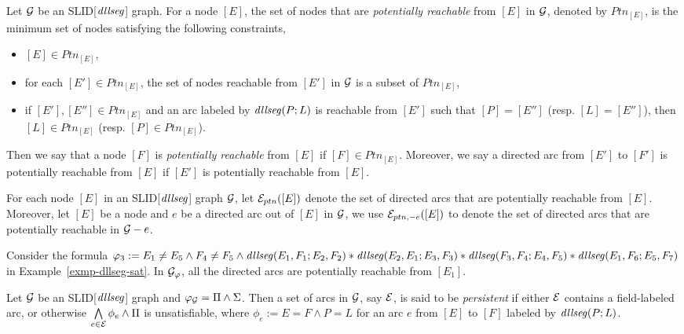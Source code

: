 \documentclass{llncs}
\begin{document}
\begin{definition}
Let $\mathcal{G}$ be an SLID[$\mathit{dllseg}$] graph. For a node $[E]$, the set of nodes that are \emph{potentially reachable} from $[E]$ in $\mathcal{G}$, denoted by $Ptn_{[E]}$, is the minimum set of nodes satisfying the following constraints,
\begin{itemize}
\item  $[E] \in Ptn_{[E]}$,

\item for each $[E'] \in Ptn_{[E]}$, the set of nodes reachable from $[E']$ in $\mathcal{G}$ is a subset of $Ptn_{[E]}$,
%
\item if $[E'], [E''] \in Ptn_{[E]}$ and an arc labeled by $\mathit{dllseg}(P; L)$ is reachable from $[E']$ such that $[P]=[E'']$ (resp. $[L]=[E'']$), then $[L] \in Ptn_{[E]}$ (resp. $[P] \in Ptn_{[E]}$).
\end{itemize}
Then we say that a node $[F]$ is \emph{potentially reachable} from $[E]$ if $[F] \in Ptn_{[E]}$. Moreover, we say a directed arc from $[E']$ to $[F']$  is potentially reachable from $[E]$ if $[E']$ is potentially reachable from $[E]$.
\end{definition}
For each node $[E]$ in an SLID[$\mathit{dllseg}$] graph $\mathcal{G}$, let $\mathcal{E}_{ptn}([E])$ denote the set of directed arcs that are potentially reachable from $[E]$. Moreover, let $[E]$ be a node and $e$ be a directed arc out of $[E]$ in $\mathcal{G}$, we use $\mathcal{E}_{ptn, - e}([E])$  to denote the set of directed arcs that are potentially reachable in $\mathcal{G}-e$.

\begin{example}
Consider the formula $\varphi_3 := E_1 \neq E_5 \wedge F_4 \neq F_5 \wedge \mathit{dllseg}(E_1, F_1; E_2, F_2) \ast \mathit{dllseg}(E_2, E_1; E_3, F_3) \ast \mathit{dllseg}(F_3, F_4; E_4, F_5) \ast \mathit{dllseg}(E_1, F_6; E_5, F_7)$ in Example~\ref{exmp-dllseg-sat}. In $\mathcal{G}_\varphi$, all the directed arcs are potentially reachable from $[E_1]$.
\end{example}



\begin{definition}
Let $\mathcal{G}$ be an SLID[$\mathit{dllseg}$] graph and $\varphi_{\mathcal{G}} = \Pi \wedge \Sigma$. Then a set of arcs in $\mathcal{G}$, say $\mathcal{E}$, is said to be \emph{persistent} if either $\mathcal{E}$ contains a field-labeled arc, or otherwise $\bigwedge \limits_{e \in \mathcal{E}} \phi_e \wedge \Pi$ is unsatisfiable, where $\phi_e := E = F \wedge P = L $ for an arc $e$ from $[E]$ to $[F]$ labeled by $\mathit{dllseg}(P; L)$.
\end{definition}
\end{document}
